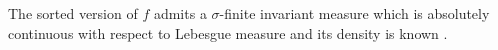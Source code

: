 The sorted version of $f$ admits a $\sigma$-finite invariant measure which is
absolutely continuous with respect to Lebesgue measure and its density is
known \cite{schweiger,MR1336331}.

